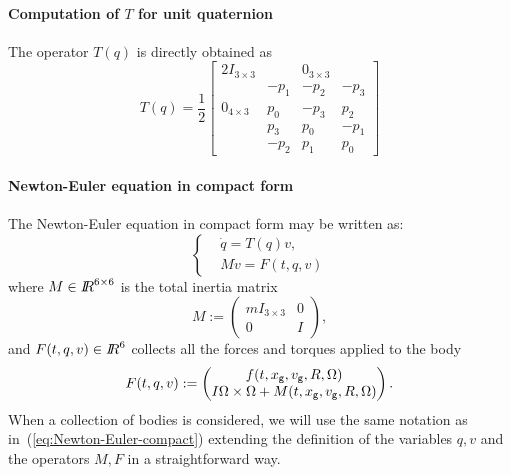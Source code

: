 \paragraph{Computation of $T$ for unit quaternion} The operator $T(q)$ is directly obtained as
\begin{equation}
  T(q)=\frac 1 2 \label{eq:5}
  \begin{bmatrix}
    2 I_{3\times 3} & & 0_{3\times 3} & \\
    &   -p_1 & -p_2 & -p_3 \\
    0_{4\times 3}  &  p_0 & -p_3 & p_2 \\
    & p_3 & p_0 & -p_1 \\
    & -p_2 & p_1 & p_0 
  \end{bmatrix}
\end{equation}

\paragraph{Newton-Euler equation in compact form}

%
The Newton-Euler equation in compact form may be written as:
\begin{equation}
\label{eq:Newton-Euler-compact}
\boxed{ \left \{ 
 \begin{aligned}
  &\dot q=T(q)v, \\
  & M \dot v = F(t, q, v)
 \end{aligned}
 \right.}
\end{equation}
where $M\in\mbox{\rm $I\!\!R$}^{6\times6}$ is the total inertia matrix
\begin{equation}
  M:= \begin{pmatrix}
    m I_{3\times 3} & 0 \\
    0 & I 
  \end{pmatrix},
\end{equation}
and $F(t, q, v)\in \mbox{\rm $I\!\!R$}^6$ collects all the forces and torques applied to the body
\begin{equation}
  F(t,q,v):= \begin{pmatrix}
    f(t,x_{\sf \small g},  v_{\sf \small g}, R, \Omega ) \\
    I \Omega \times \Omega + M(t,x_{\sf \small g}, v_{\sf \small g}, R, \Omega )
  \end{pmatrix}.
\end{equation}
When a collection of bodies is considered, we will use the same notation as in~(\ref{eq:Newton-Euler-compact}) extending the definition of the variables $q,v$ and the operators $M,F$ in a straightforward way.


